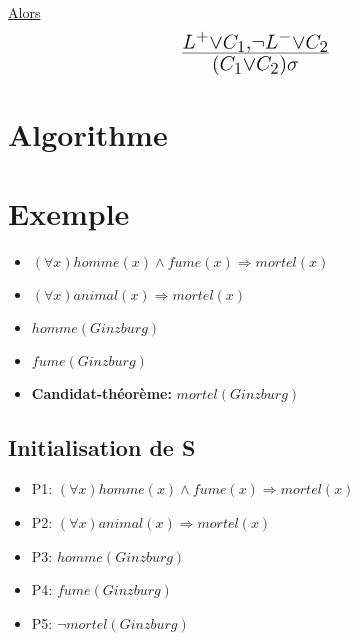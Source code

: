 \underline{Alors} $$ \mbox{\huge $\frac{L^{+} \vee C_1, \neg L^{-} \vee C_2}{(C_1 \vee C_2)\sigma}$ } $$

\section{Algorithme}
\begin{algorithm}
\end{algorithm}

\section{Exemple}
\begin{itemize}
  \item $(\forall x) homme(x) \wedge fume(x) \Rightarrow mortel(x)$
  \item $(\forall x) animal(x) \Rightarrow mortel(x)$
  \item $homme(Ginzburg)$
  \item $fume(Ginzburg)$
  \item \textbf{Candidat-théorème:} $mortel(Ginzburg)$
\end{itemize}

\subsection{Initialisation de S}
\begin{itemize}
  \item P1: $(\forall x) homme(x) \wedge fume(x) \Rightarrow mortel(x)$
  \item P2: $(\forall x) animal(x) \Rightarrow mortel(x)$
  \item P3: $homme(Ginzburg)$
  \item P4: $fume(Ginzburg)$
  \item P5: $\neg mortel(Ginzburg)$
\end{itemize}


